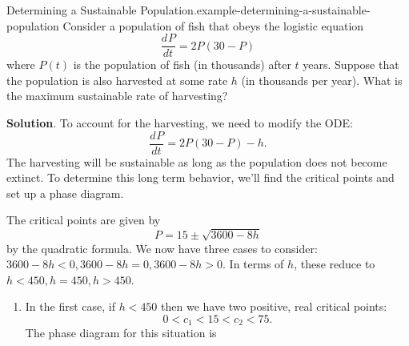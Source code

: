 \documentclass[10pt,]{book}
\numberwithin{equation}{section}
\newcommand{\dv}[3][]{\dfrac{d^{#1} #2}{d #3^{#1}}}
\newcommand{\lt}{<}
\newcommand{\gt}{>}
\begin{document}
\begin{example}{Determining a Sustainable Population.}{example-determining-a-sustainable-population}%
\hypertarget{p-760}{}%
Consider a population of fish that obeys the logistic equation%
\begin{equation*}
\dv{P}{t} = 2P(30 - P)
\end{equation*}
where \(P(t)\) is the population of fish (in thousands) after \(t\) years. Suppose that the population is also harvested at some rate \(h\) (in thousands per year). What is the maximum sustainable rate of harvesting?%
\par\smallskip%
\noindent\textbf{Solution}.\hypertarget{solution-160}{}\quad%
\hypertarget{p-761}{}%
To account for the harvesting, we need to modify the ODE:%
\begin{equation*}
\dv{P}{t} = 2P(30 - P) - h.
\end{equation*}
The harvesting will be sustainable as long as the population does not become extinct. To determine this long term behavior, we'll find the critical points and set up a phase diagram.%
\par
\hypertarget{p-762}{}%
The critical points are given by%
\begin{equation*}
P = 15 \pm \sqrt{3600 - 8h}
\end{equation*}
by the quadratic formula. We now have three cases to consider: \(3600 - 8h \lt 0, 3600 - 8h = 0, 3600 - 8h \gt 0.\) In terms of \(h\), these reduce to \(h \lt 450, h = 450, h \gt 450\).%
\leavevmode%
\begin{enumerate}
\item\hypertarget{li-65}{}\hypertarget{p-763}{}%
In the first case, if \(h \lt 450\) then we have two positive, real critical points:%
\begin{equation*}
0 \lt c_{1} \lt 15 \lt c_{2} \lt 75.
\end{equation*}
The phase diagram for this situation is%
\begin{figure}
\centering
{
}
\end{figure}
\end{enumerate}
\end{example}
\end{document}
